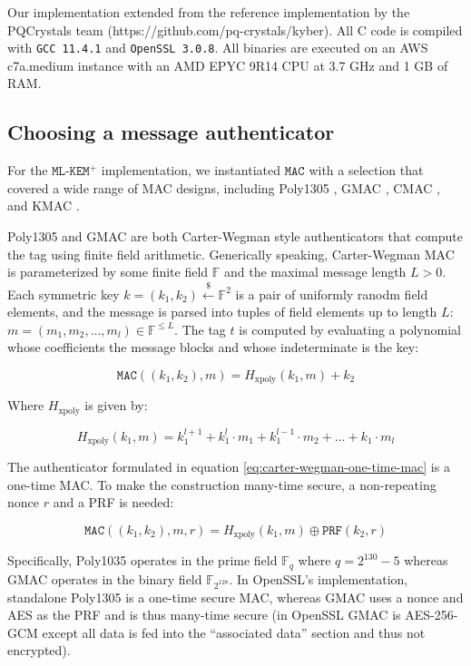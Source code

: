 \documentclass[journal=tches,submission]{iacrtrans}
\newcommand{\mac}{\texttt{MAC}}
\newcommand{\leftsample}{\stackrel{\$}{\leftarrow}}
\begin{document}
Our implementation extended from the reference implementation by the PQCrystals team (https://github.com/pq-crystals/kyber). All C code is compiled with \texttt{GCC 11.4.1} and \texttt{OpenSSL 3.0.8}. All binaries are executed on an AWS c7a.medium instance with an AMD EPYC 9R14 CPU at 3.7 GHz and 1 GB of RAM.

\subsection{Choosing a message authenticator}
For the $\texttt{ML-KEM}^+$ implementation, we instantiated $\mac$ with a selection that covered a wide range of MAC designs, including Poly1305 \cite{bernstein2005poly1305}, GMAC \cite{mcgrew2004galois}, CMAC \cite{iwata2003omac}\cite{black2000cbc}, and KMAC \cite{SP80053r4}.

Poly1305 and GMAC are both Carter-Wegman style authenticators \cite{wegman1981new} that compute the tag using finite field arithmetic. Generically speaking, Carter-Wegman MAC is parameterized by some finite field $\mathbb{F}$ and the maximal message length $L > 0$. Each symmetric key $k = (k_1, k_2) \leftsample \mathbb{F}^2$ is a pair of uniformly ranodm field elements, and the message is parsed into tuples of field elements up to length $L$: $m = (m_1, m_2, \ldots, m_l) \in \mathbb{F}^{\leq L}$. The tag $t$ is computed by evaluating a polynomial whose coefficients the message blocks and whose indeterminate is the key:

\begin{equation}\label{eq:carter-wegman-one-time-mac}
    \mac((k_1, k_2), m) = H_\text{xpoly}(k_1, m) + k_2
\end{equation}

Where $H_\text{xpoly}$ is given by:

\begin{equation*}
    H_\text{xpoly}(k_1, m) = k_1^{l+1} + k_1^l \cdot m_1 + k_1^{l-1} \cdot m_2 + \ldots + k_1 \cdot m_l
\end{equation*}

The authenticator formulated in equation \ref{eq:carter-wegman-one-time-mac} is a one-time MAC. To make the construction many-time secure, a non-repeating nonce $r$ and a PRF is needed:

\begin{equation*}
    \mac((k_1, k_2), m, r) = H_\text{xpoly}(k_1, m) \oplus \texttt{PRF}(k_2, r)
\end{equation*}

Specifically, Poly1035 operates in the prime field $\mathbb{F}_q$ where $q = 2^{130} - 5$ whereas GMAC operates in the binary field $\mathbb{F}_{2^{128}}$. In OpenSSL's implementation, standalone Poly1305 is a one-time secure MAC, whereas GMAC uses a nonce and AES as the PRF and is thus many-time secure (in OpenSSL GMAC is AES-256-GCM except all data is fed into the ``associated data'' section and thus not encrypted).
\end{document}
